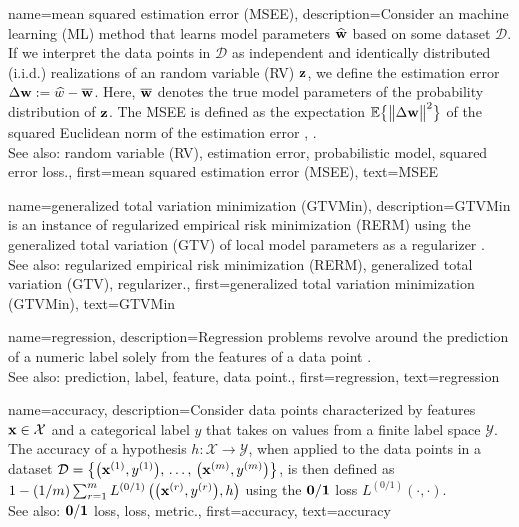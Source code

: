 {
{name={mean squared estimation error (MSEE)},
	description={Consider an machine learning (ML) method that 
		learns model parameters $\widehat{{\bf w}}$ based on some dataset $\mathcal{D}$. 
		If we interpret the data points in $\mathcal{D}$ as independent and identically distributed (i.i.d.) realizations of an random variable (RV) ${\bf z}$, 
		we define the estimation error $\Delta {\bf w} := \widehat{w} - \overline{{\bf w}}$. 
		Here, $\overline{{\bf w}}$ denotes the true model parameters of the probability distribution 
		of ${\bf z}$. The MSEE is 
		defined as the expectation $\mathbb{E}  \big\{ \big\| \Delta {\bf w} \big\|^{2} \big\}$ of the 
		squared Euclidean norm of the estimation error \cite{LC}, \cite{kay}.
					\\ 
		See also: random variable (RV), estimation error, probabilistic model, squared error loss.},
	first={mean squared estimation error (MSEE)},
	text={MSEE} 
}

{name={generalized total variation minimization (GTVMin)},
	description={GTVMin is an instance of regularized empirical risk minimization (RERM) 
		using the generalized total variation (GTV) of local model parameters as a regularizer \cite{ClusteredFLTVMinTSP}.
					\\ 
		See also: regularized empirical risk minimization (RERM), generalized total variation (GTV), regularizer.},
	first={generalized total variation minimization (GTVMin)},
	text={GTVMin} 
}

{name={regression},
	description={Regression problems revolve around the 
		prediction of a numeric label solely from the features of a data point \cite[Ch. 2]{MLBasics}.
					\\ 
		See also: prediction, label, feature, data point.},
	first={regression},
	text={regression} 
}

{name={accuracy},
	description={Consider data points characterized by features ${\bf x} \in \mathcal{X}$ and 
		a categorical label $y$ that takes on values from a finite label space $\mathcal{Y}$. The 
		accuracy of a hypothesis $h: \mathcal{X} \rightarrow \mathcal{Y}$, when applied to the data points in a dataset 
		$\mathcal{D} = \big\{ \big({\bf x}^{(1)}, y^{(1)} \big), \,\ldots, \,\big({\bf x}^{(m)},y^{(m)}\big) \big\}$, 
		is then defined as $1 - (1/m)\sum_{r=1}^{m} L^{(0/1)}\left(\big({\bf x}^{(r)},y^{(r)}\big),h \right)$ 
		using the $\bf 0/1$ loss $L^{(0/1)}\left(\cdot,\cdot \right)$.
					\\ 
		See also: $\bf 0/1$ loss, loss, metric.},
	first={accuracy},
	text={accuracy} 
}


}
